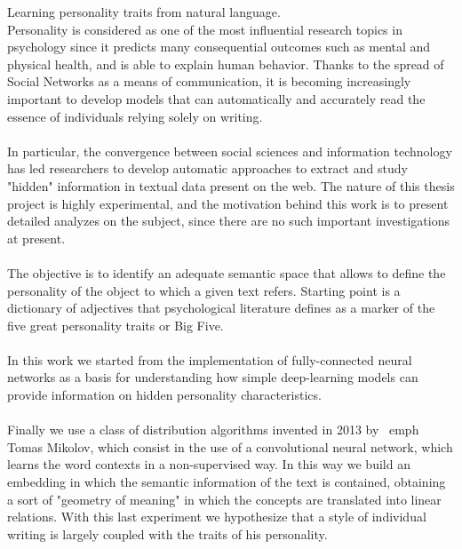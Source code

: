 Learning personality traits from natural language. \\


Personality is considered as one of the most influential research topics in psychology since it predicts many consequential outcomes such as mental and physical health, and is able to explain human behavior.
Thanks to the spread of Social Networks as a means of communication, it is becoming increasingly important to develop models that can automatically and accurately read the essence of individuals relying solely on writing.
\\\\
In particular, the convergence between social sciences and information technology has led researchers to develop automatic approaches to extract and study "hidden" information in textual data present on the web.
The nature of this thesis project is highly experimental, and the motivation behind this work is to present detailed analyzes on the subject, since there are no such important investigations at present.
\\\\
The objective is to identify an adequate semantic space that allows to define the personality of the object to which a given text refers. Starting point is a dictionary of adjectives that psychological literature defines as a marker of the five great personality traits or Big Five.
\\\\
In this work we started from the implementation of fully-connected neural networks as a basis for understanding how simple deep-learning models can provide information on hidden personality characteristics.
\\\\
Finally we use a class of distribution algorithms invented in 2013 by \ emph {Tomas Mikolov}, which consist in the use of a convolutional neural network, which learns the word contexts in a non-supervised way.
In this way we build an embedding in which the semantic information of the text is contained, obtaining a sort of "geometry of meaning" in which the concepts are translated into linear relations.
With this last experiment we hypothesize that a style of individual writing is largely coupled with the traits of his personality.





